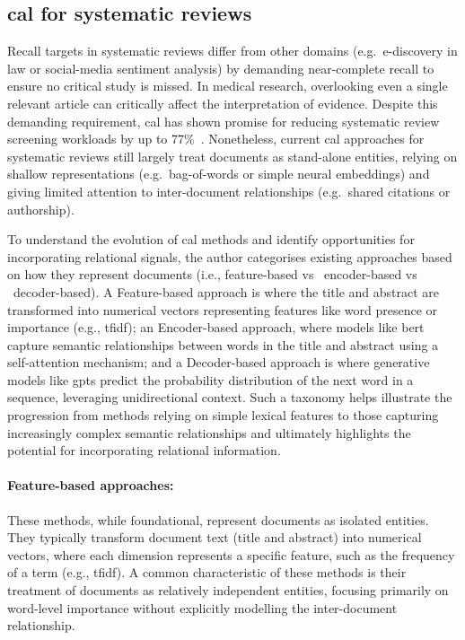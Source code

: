 \documentclass[10pt,oneside]{book}
\begin{document}
\subsection{\gls*{cal} for systematic reviews}

Recall targets in systematic reviews differ from other domains (e.g.\ e-discovery in law or social-media sentiment analysis) by demanding near-complete recall to ensure no critical study is missed. In medical research, overlooking even a single relevant article can critically affect the interpretation of evidence. Despite this demanding requirement, \gls*{cal} has shown promise for reducing systematic review screening workloads by up to 77\%~\cite{van_der_vet_propagation_2016}. Nonetheless, current \gls*{cal} approaches for systematic reviews still largely treat documents as stand-alone entities, relying on shallow representations (e.g.\ bag-of-words or simple neural embeddings) and giving limited attention to inter-document relationships (e.g.\ shared citations or authorship).

To understand the evolution of \gls*{cal} methods and identify opportunities for incorporating relational signals, the author categorises existing approaches based on how they represent documents (i.e., feature-based vs \ encoder-based vs \ decoder-based). A Feature-based approach is where the title and abstract are transformed into numerical vectors representing features like word presence or importance (e.g., \gls*{tfidf}); an Encoder-based approach, where models like \gls*{bert} capture semantic relationships between words in the title and abstract using a self-attention mechanism; and a Decoder-based approach is where generative models like \glspl*{gpt} predict the probability distribution of the next word in a sequence, leveraging unidirectional context. Such a taxonomy helps illustrate the progression from methods relying on simple lexical features to those capturing increasingly complex semantic relationships and ultimately highlights the potential for incorporating relational information.

\paragraph{Feature-based approaches:}
These methods, while foundational, represent documents as isolated entities. They typically transform document text (title and abstract) into numerical vectors, where each dimension represents a specific feature, such as the frequency of a term (e.g., \gls*{tfidf}). A common characteristic of these methods is their treatment of documents as relatively independent entities, focusing primarily on word-level importance without explicitly modelling the inter-document relationship.
\end{document}
